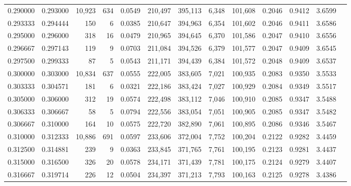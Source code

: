 \begin{tabular}{rrrrrrrrrrrrr}
0.290000 & 0.293000 & 10,923 &   634 &                                     0.0549 & 210,497 & 395,113 &   6,348 & 101,608 & 0.2046 & 0.9412 & 3.6599 \\
0.293333 & 0.294444 &    150 &     6 &                                     0.0385 & 210,647 & 394,963 &   6,354 & 101,602 & 0.2046 & 0.9411 & 3.6586 \\
0.295000 & 0.296000 &    318 &    16 &                                     0.0479 & 210,965 & 394,645 &   6,370 & 101,586 & 0.2047 & 0.9410 & 3.6556 \\
0.296667 & 0.297143 &    119 &     9 &                                     0.0703 & 211,084 & 394,526 &   6,379 & 101,577 & 0.2047 & 0.9409 & 3.6545 \\
0.297500 & 0.299333 &     87 &     5 &                                     0.0543 & 211,171 & 394,439 &   6,384 & 101,572 & 0.2048 & 0.9409 & 3.6537 \\
0.300000 & 0.303000 & 10,834 &   637 &                                     0.0555 & 222,005 & 383,605 &   7,021 & 100,935 & 0.2083 & 0.9350 & 3.5533 \\
0.303333 & 0.304571 &    181 &     6 &                                     0.0321 & 222,186 & 383,424 &   7,027 & 100,929 & 0.2084 & 0.9349 & 3.5517 \\
0.305000 & 0.306000 &    312 &    19 &                                     0.0574 & 222,498 & 383,112 &   7,046 & 100,910 & 0.2085 & 0.9347 & 3.5488 \\
0.306333 & 0.306667 &     58 &     5 &                                     0.0794 & 222,556 & 383,054 &   7,051 & 100,905 & 0.2085 & 0.9347 & 3.5482 \\
0.306667 & 0.310000 &    164 &    10 &                                     0.0575 & 222,720 & 382,890 &   7,061 & 100,895 & 0.2086 & 0.9346 & 3.5467 \\
0.310000 & 0.312333 & 10,886 &   691 &                                     0.0597 & 233,606 & 372,004 &   7,752 & 100,204 & 0.2122 & 0.9282 & 3.4459 \\
0.312500 & 0.314881 &    239 &     9 &                                     0.0363 & 233,845 & 371,765 &   7,761 & 100,195 & 0.2123 & 0.9281 & 3.4437 \\
0.315000 & 0.316500 &    326 &    20 &                                     0.0578 & 234,171 & 371,439 &   7,781 & 100,175 & 0.2124 & 0.9279 & 3.4407 \\
0.316667 & 0.319714 &    226 &    12 &                                     0.0504 & 234,397 & 371,213 &   7,793 & 100,163 & 0.2125 & 0.9278 & 3.4386 \\

\end{tabular}
